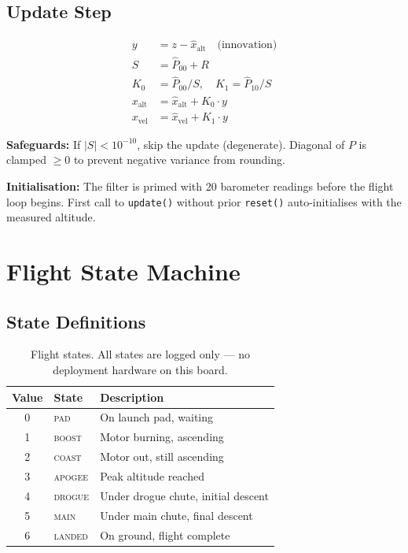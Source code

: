 \documentclass[11pt, a4paper, twoside]{article}
\newcommand{\state}[1]{\textsc{#1}}
\begin{document}
\subsection{Update Step}
\begin{align}
y &= z - \hat{x}_\text{alt} \quad \text{(innovation)} \\
S &= \hat{P}_{00} + R \\
K_0 &= \hat{P}_{00} / S, \quad K_1 = \hat{P}_{10} / S \\
x_\text{alt} &= \hat{x}_\text{alt} + K_0 \cdot y \\
x_\text{vel} &= \hat{x}_\text{vel} + K_1 \cdot y
\end{align}

\textbf{Safeguards:} If $|S| < 10^{-10}$, skip the update (degenerate). Diagonal of $P$ is clamped $\geq 0$ to prevent negative variance from rounding.

\textbf{Initialisation:} The filter is primed with 20 barometer readings before the flight loop begins. First call to \texttt{update()} without prior \texttt{reset()} auto-initialises with the measured altitude.

\section{Flight State Machine}
\label{sec:fsm}

\subsection{State Definitions}

\begin{table}[ht]
\centering
\caption{Flight states. All states are logged only --- no deployment hardware on this board.}
\label{tab:states}
\begin{tabular}{c l l}
\toprule
\textbf{Value} & \textbf{State} & \textbf{Description} \\
\midrule
0 & \state{pad} & On launch pad, waiting \\
1 & \state{boost} & Motor burning, ascending \\
2 & \state{coast} & Motor out, still ascending \\
3 & \state{apogee} & Peak altitude reached \\
4 & \state{drogue} & Under drogue chute, initial descent \\
5 & \state{main} & Under main chute, final descent \\
6 & \state{landed} & On ground, flight complete \\
\bottomrule
\end{tabular}
\end{table}
\end{document}
